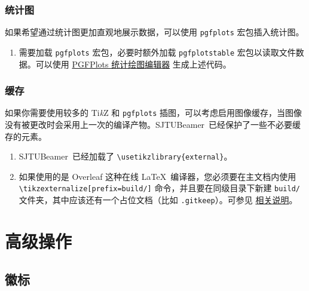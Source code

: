 \documentclass[
    UTF8,
    heading=true,
    12pt,
    a4paper
]{ctexrep}
\newenvironment{commentlist}{\begin{enumerate}\small}{\end{enumerate}}
\def\themename{\textsf{SJTUBeamer}}
\begin{document}
\section{统计图}

如果希望通过统计图更加直观地展示数据，可以使用 \texttt{pgfplots} 宏包插入统计图。


\begin{commentlist}
  \item 需要加载 \texttt{pgfplots} 宏包，必要时额外加载 \texttt{pgfplotstable} 宏包以读取文件数据。可以使用 \href{https://logcreative.github.io/PGFPlotsEdt/}{PGFPlots 统计绘图编辑器} 生成上述代码。
\end{commentlist}

\section{缓存}

如果你需要使用较多的 Ti\emph{k}Z 和 \texttt{pgfplots} 插图，可以考虑启用图像缓存，当图像没有被更改时会采用上一次的编译产物。\themename\ 已经保护了一些不必要缓存的元素。


\begin{commentlist}
  \item \themename\ 已经加载了 \verb"\usetikzlibrary{external}"。
  \item[\faExclamationTriangle] 如果使用的是 Overleaf 这种在线 \LaTeX\ 编译器，您必须要在主文档内使用 \verb"\tikzexternalize[prefix=build/]" 命令，并且要在同级目录下新建 \verb"build/" 文件夹，其中应该还有一个占位文档（比如 \verb".gitkeep"）。可参见 \href{https://www.overleaf.com/learn/latex/Questions/I_have_a_lot_of_tikz%2C_matlab2tikz_or_pgfplots_figures%2C_so_I%27m_getting_a_compilation_timeout._Can_I_externalise_my_figures%3F}{相关说明}。
\end{commentlist}


\part{高级操作}
\chapter{徽标}
\end{document}
